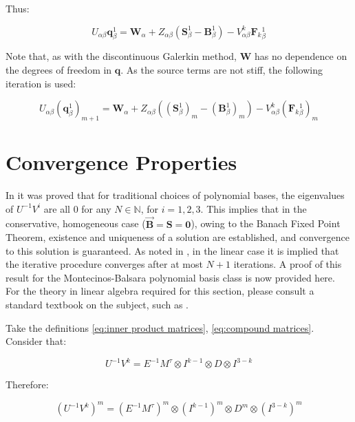 \documentclass[twoside,english,final,5p,times,twocolumn]{elsarticle}
\begin{document}
Thus:

\begin{equation}
U_{\alpha\beta}\boldsymbol{q}_{\beta}^{1}=\boldsymbol{W}_{\alpha}+Z_{\alpha\beta}\left(\boldsymbol{S}_{\beta}^{1}-\boldsymbol{B}_{\beta}^{1}\right)-V_{\alpha\beta}^{k}\boldsymbol{F}_{k}{}_{\beta}^{1}\label{eq:CGit}
\end{equation}

Note that, as with the discontinuous Galerkin method, $\boldsymbol{W}$
has no dependence on the degrees of freedom in $\boldsymbol{q}$.
As the source terms are not stiff, the following iteration is used:

\begin{equation}
U_{\alpha\beta}\left(\boldsymbol{q}_{\beta}^{1}\right)_{m+1}=\boldsymbol{W}_{\alpha}+Z_{\alpha\beta}\left(\left(\boldsymbol{S}_{\beta}^{1}\right)_{m}-\left(\boldsymbol{B}_{\beta}^{1}\right)_{m}\right)-V_{\alpha\beta}^{k}\left(\boldsymbol{F}_{k}{}_{\beta}^{1}\right)_{m}
\end{equation}

\section{Convergence Properties}

In \citet{Jackson2017} it was proved that for traditional choices
of polynomial bases, the eigenvalues of $U^{-1}V^{i}$ are all 0 for
any $N\in\mathbb{N}$, for $i=1,2,3$. This implies that in the conservative,
homogeneous case ($\overrightarrow{\boldsymbol{B}}=\boldsymbol{S}=\boldsymbol{0}$),
owing to the Banach Fixed Point Theorem, existence and uniqueness
of a solution are established, and convergence to this solution is
guaranteed. As noted in \citet{Dumbser2009a}, in the linear case
it is implied that the iterative procedure converges after at most
$N+1$ iterations. A proof of this result for the Montecinos-Balsara
polynomial basis class is now provided here. For the theory in linear
algebra required for this section, please consult a standard textbook
on the subject, such as \citet{Nering1970}.

Take the definitions \eqref{eq:inner product matrices}, \eqref{eq:compound matrices}.
Consider that:

\begin{equation}
U^{-1}V^{k}=E^{-1}M^{\tau}\otimes I^{k-1}\otimes D\otimes I^{3-k}
\end{equation}

Therefore:

\begin{equation}
\left(U^{-1}V^{k}\right)^{m}=\left(E^{-1}M^{\tau}\right)^{m}\otimes\left(I^{k-1}\right)^{m}\otimes D^{m}\otimes\left(I^{3-k}\right)^{m}
\end{equation}
\end{document}
